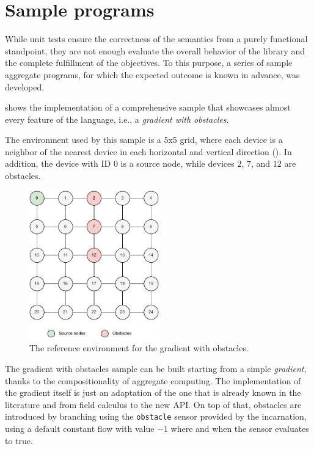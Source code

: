 \section{Sample programs}

While unit tests ensure the correctness of the semantics from a purely functional standpoint, they are not enough evaluate the overall behavior of the library and the complete fulfillment of the objectives.
%
To this purpose, a series of sample aggregate programs, for which the expected outcome is known in advance, was developed.

 shows the implementation of a comprehensive sample that showcases almost every feature of the language, i.e., a \textit{gradient with obstacles}.
%

%
The environment used by this sample is a 5x5 grid, where each device is a neighbor of the nearest device in each horizontal and vertical direction ().
%
In addition, the device with ID $0$ is a source node, while devices $2$, $7$, and $12$ are obstacles.
%
\begin{figure}
    \centering
    \includegraphics[width=0.5\textwidth]{figures/samples/gradient-environment.pdf}
    \caption{The reference environment for the gradient with obstacles.}
    \label{fig:gradient-environment}
\end{figure}

The gradient with obstacles sample can be built starting from a simple \textit{gradient}, thanks to the compositionality of aggregate computing.
%
The implementation of the gradient itself is just an adaptation of the one that is already known in the literature and from field calculus to the new API.
%
On top of that, obstacles are introduced by branching using the \texttt{obstacle} sensor provided by the incarnation, using a default constant flow with value $-1$ where and when the sensor evaluates to true.

